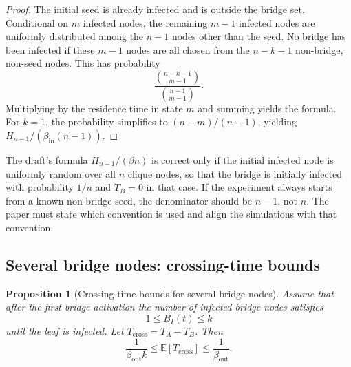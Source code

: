 \documentclass[12pt,a4paper]{article}
\newtheorem{proposition}{Proposition}
\theoremstyle{definition}
\newcommand{\E}{\mathbb{E}}
\newcommand{\1}{\mathbf{1}}
\begin{document}
\begin{proof}
The initial seed is already infected and is outside the bridge set.  Conditional on $m$ infected nodes, the remaining $m-1$ infected nodes are uniformly distributed among the $n-1$ nodes other than the seed.  No bridge has been infected if these $m-1$ nodes are all chosen from the $n-k-1$ non-bridge, non-seed nodes.  This has probability
\begin{equation}
    \frac{\binom{n-k-1}{m-1}}{\binom{n-1}{m-1}}.
\end{equation}
Multiplying by the residence time in state $m$ and summing yields the formula.  For $k=1$, the probability simplifies to $(n-m)/(n-1)$, yielding $H_{n-1}/(\beta_{\mathrm{in}}(n-1))$.
\end{proof}

\begin{tcolorbox}[colback=yellow!8,colframe=yellow!50!black,title=Important correction]
The draft's formula $H_{n-1}/(\beta n)$ is correct only if the initial infected node is uniformly random over all $n$ clique nodes, so that the bridge is initially infected with probability $1/n$ and $T_B=0$ in that case.  If the experiment always starts from a known non-bridge seed, the denominator should be $n-1$, not $n$.  The paper must state which convention is used and align the simulations with that convention.
\end{tcolorbox}

\subsection{Several bridge nodes: crossing-time bounds}

\begin{proposition}[Crossing-time bounds for several bridge nodes]
Assume that after the first bridge activation the number of infected bridge nodes satisfies
\begin{equation}
    1\le B_I(t)\le k
\end{equation}
until the leaf is infected.  Let $T_{\mathrm{cross}}=T_A-T_B$.  Then
\begin{equation}
    \frac{1}{\beta_{\mathrm{out}}k}\le \E[T_{\mathrm{cross}}]\le \frac{1}{\beta_{\mathrm{out}}}.
\end{equation}
\end{proposition}
\end{document}
